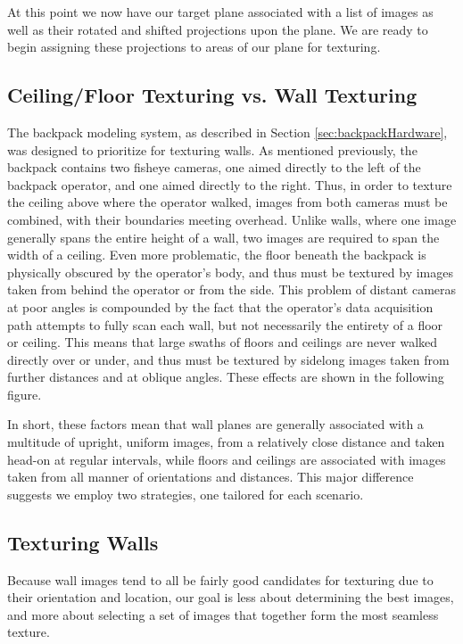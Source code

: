 \documentclass[10pt,twocolumn,letterpaper]{article}
\begin{document}
At this point we now have our target plane associated with a list of
images as well as their rotated and shifted projections upon the
plane. We are ready to begin assigning these projections to areas of
our plane for texturing.



\subsection{Ceiling/Floor Texturing vs. Wall Texturing}
\label{sec:whydifferent}
The backpack modeling system, as described in Section
\ref{sec:backpackHardware}, was designed to prioritize for texturing
walls. As mentioned previously, the backpack contains two fisheye
cameras, one aimed directly to the left of the backpack operator, and
one aimed directly to the right. Thus, in order to texture the ceiling
above where the operator walked, images from both cameras must be
combined, with their boundaries meeting overhead. Unlike walls, where
one image generally spans the entire height of a wall, two images are
required to span the width of a ceiling. Even more problematic, the
floor beneath the backpack is physically obscured by the operator's
body, and thus must be textured by images taken from behind the
operator or from the side. This problem of distant cameras at poor
angles is compounded by the fact that the operator's data acquisition
path attempts to fully scan each wall, but not necessarily the
entirety of a floor or ceiling. This means that large swaths of floors
and ceilings are never walked directly over or under, and thus must be
textured by sidelong images taken from further distances and at
oblique angles. These effects are shown in the following figure.

In short, these factors mean that wall planes are generally associated
with a multitude of upright, uniform images, from a relatively close
distance and taken head-on at regular intervals, while floors and
ceilings are associated with images taken from all manner of
orientations and distances. This major difference suggests we employ
two strategies, one tailored for each scenario.


\subsection{Texturing Walls}
Because wall images tend to all be fairly good candidates for
texturing due to their orientation and location, our goal is less
about determining the best images, and more about selecting a set of
images that together form the most seamless texture.
\end{document}
